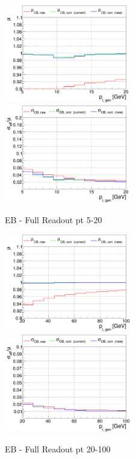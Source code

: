 \begin{figure}
\includegraphics[width=0.495\textwidth]{./ECAL_plots/plotsNOPU/EB/FULL/pdf/GENPT/EBFULL_GENPT_0005_0020_MuOverBins.pdf}
\includegraphics[width=0.495\textwidth]{./ECAL_plots/plotsNOPU/EB/FULL/pdf/GENPT/EBFULL_GENPT_0005_0020_EffSigmaOverBins.pdf}
\caption{EB - Full Readout pt 5-20}
\end{figure}

\begin{figure}
\includegraphics[width=0.495\textwidth]{./ECAL_plots/plotsNOPU/EB/FULL/pdf/GENPT/EBFULL_GENPT_0020_0100_MuOverBins.pdf}
\includegraphics[width=0.495\textwidth]{./ECAL_plots/plotsNOPU/EB/FULL/pdf/GENPT/EBFULL_GENPT_0020_0100_EffSigmaOverBins.pdf}
\caption{EB - Full Readout pt 20-100}
\end{figure}

